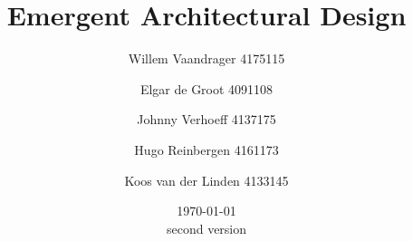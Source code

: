 \begin{titlepage}
\title{{\Huge Emergent Architectural Design}}
\author{Willem Vaandrager 4175115 \\
\and Elgar de Groot 4091108 \\
\and Johnny Verhoeff 4137175 \\
\and Hugo Reinbergen 4161173 \\
\and Koos van der Linden 4133145}
\date{\today \\ second version}
\maketitle
\end{titlepage}